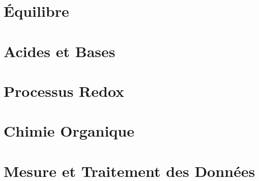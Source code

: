 \documentclass[french, a4paper, 12pt]{article}
\begin{document}
\section{Équilibre}
\pagebreak

\section{Acides et Bases}
\pagebreak

\section{Processus Redox}
\pagebreak

\section{Chimie Organique}
\pagebreak

\section{Mesure et Traitement des Données}
\pagebreak
\end{document}
